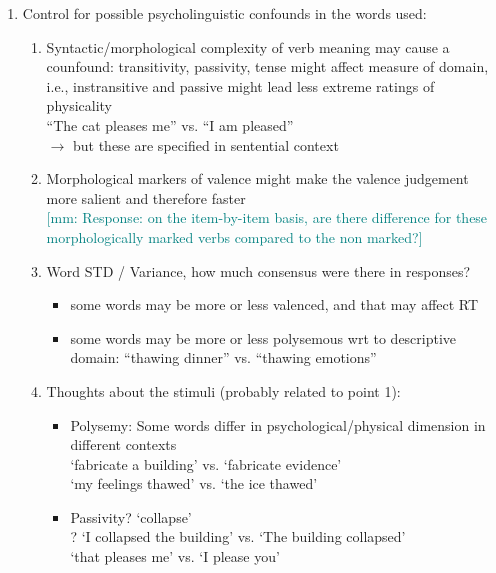 \documentclass[12pt,letterpaper,table,svgnames,dvipsnames]{article}
\newcommand{\mm}[1]{\textcolor{teal}{[mm: #1]}}
\begin{document}
\begin{enumerate}

    \item Control for possible psycholinguistic confounds in the words used: 

        \begin{enumerate}
            \item Syntactic/morphological complexity of verb meaning may cause a counfound: transitivity, passivity, tense might affect measure of domain, i.e., instransitive and passive might lead less extreme ratings of physicality\\
            ``The cat pleases me'' vs. ``I am pleased'' \\
            $\rightarrow$ but these are specified in sentential context

            \item Morphological markers of valence might make the valence judgement more salient and therefore faster\\
            \mm{Response: on the item-by-item basis, are there difference for these morphologically marked verbs compared to the non marked?}

            \item Word STD / Variance, how much consensus were there in responses?
                \begin{itemize}
                    \item some words may be more or less valenced, and that may affect RT
                    \item some words may be more or less polysemous wrt to descriptive domain: ``thawing dinner'' vs. ``thawing emotions'' 
                \end{itemize}
            
            \item Thoughts about the stimuli (probably related to point 1):

                \begin{itemize}
                    \item Polysemy: Some words differ in psychological/physical dimension in different contexts\\
                    `fabricate a building' vs. `fabricate evidence'\\
                    `my feelings thawed' vs. `the ice thawed'

                    \item Passivity? `collapse'\\ 
                    ? `I collapsed the building' vs. `The building collapsed'\\
                    `that pleases me' vs. `I please you' 



\end{itemize}
\end{enumerate}
\end{enumerate}
\end{document}
